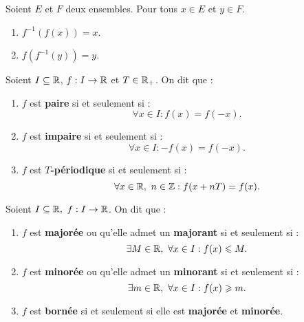 \begin{proposition}
	Soient $E$ et $F$ deux ensembles. Pour tous $x \in E$ et $y \in F$.
    \begin{multicols}{2}
        \begin{enumerate}
            \item $f^{-1} (f(x)) = x$.
            \item $f(f^{-1}(y)) = y$.
        \end{enumerate}
    \end{multicols}
\end{proposition}

\begin{definition}
	Soient $I \subseteq \mathbb{R}$, $f : I \to \mathbb{R}$ et $T \in \mathbb{R}_+$. On dit que :
    \begin{enumerate}
        \item $f$ est \textbf{paire} si et seulement si : 
        \[ \forall x \in I : f(x) = f(-x). \]
        \item $f$ est \textbf{impaire} si et seulement si  :
        \[ \forall x \in I : -f(x) = f(-x). \]
        \item $f$ est \textbf{$T$-périodique} si et seulement si :
        \[ \forall x \in \mathbb{R},\ n \in \mathbb{Z} : f(x + nT) = f(x). \]
    \end{enumerate}
\end{definition}

\begin{definition}
	Soient $I \subseteq \mathbb{R},\ f : I \to \mathbb{R}$. On dit que :
	\begin{enumerate}
	    \item $f$ est \textbf{majorée} ou qu'elle admet un \textbf{majorant} si et seulement si : 
	    \[ \exists M \in \mathbb{R},\ \forall x \in I : f(x) \leqslant M. \]
        \item $f$ est \textbf{minorée} ou qu'elle admet un \textbf{minorant} si et seulement si :
        \[ \exists m \in \mathbb{R},\ \forall x \in I : f(x) \geqslant m. \]
        \item $f$ est \textbf{bornée} si et seulement si elle est \textbf{majorée} et \textbf{minorée}.
	\end{enumerate}
\end{definition}

